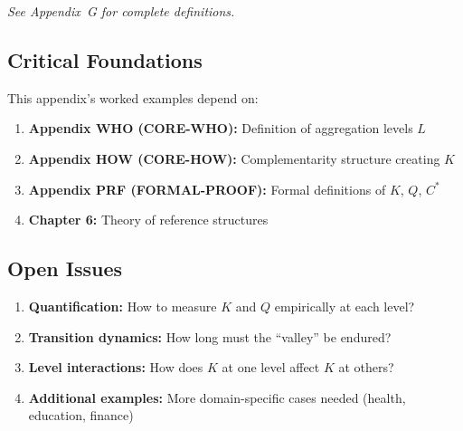 \noindent\textit{See Appendix~G for complete definitions.}


\subsection{Critical Foundations}

\begin{tcolorbox}[colback=red!5!white, colframe=red!75!black,
    title=\textbf{Critical Foundations for Appendix EXM}]

This appendix's worked examples depend on:

\begin{enumerate}
    \item \textbf{Appendix WHO (CORE-WHO):} Definition of aggregation levels $L$
    \item \textbf{Appendix HOW (CORE-HOW):} Complementarity structure creating $K$
    \item \textbf{Appendix PRF (FORMAL-PROOF):} Formal definitions of $K$, $Q$, $C^*$
    \item \textbf{Chapter 6:} Theory of reference structures
\end{enumerate}

\end{tcolorbox}


\subsection{Open Issues}

\begin{enumerate}
    \item \textbf{Quantification:} How to measure $K$ and $Q$ empirically at each level?
    \item \textbf{Transition dynamics:} How long must the ``valley'' be endured?
    \item \textbf{Level interactions:} How does $K$ at one level affect $K$ at others?
    \item \textbf{Additional examples:} More domain-specific cases needed (health, education, finance)
\end{enumerate}

